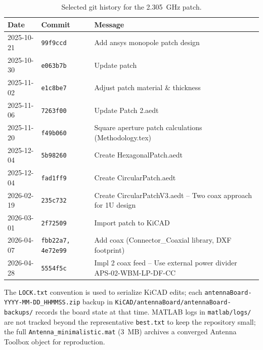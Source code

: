 \begin{table}[H]
\centering
\caption{Selected git history for the 2.305~GHz patch.}
\label{tab:githistory}
\begin{tabular}{l l p{7.5cm}}
\toprule
Date & Commit & Message \\
\midrule
2025-10-21 & \texttt{99f9ccd} & Add ansys monopole patch design \\
2025-10-30 & \texttt{e063b7b} & Update patch \\
2025-11-02 & \texttt{e1c8be7} & Adjust patch material \& thickness \\
2025-11-06 & \texttt{7263f00} & Update Patch 2.aedt \\
2025-11-20 & \texttt{f49b060} & Square aperture patch calculations (Methodology.tex) \\
2025-12-04 & \texttt{5b98260} & Create HexagonalPatch.aedt \\
2025-12-04 & \texttt{fad1ff9} & Create CircularPatch.aedt \\
2026-02-19 & \texttt{235c732} & Create CircularPatchV3.aedt -- Two coax approach for 1U design \\
2026-03-01 & \texttt{2f72509} & Import patch to KiCAD \\
2026-04-07 & \texttt{fbb22a7, 4e72e99} & Add coax (Connector\_Coaxial library, DXF footprint) \\
2026-04-28 & \texttt{5554f5c} & Impl 2 coax feed -- Use external power divider APS-02-WBM-LP-DF-CC \\
\bottomrule
\end{tabular}
\end{table}

The \texttt{LOCK.txt} convention is used to serialize KiCAD edits; each \texttt{antennaBoard-YYYY-MM-DD\_HHMMSS.zip} backup in \texttt{KiCAD/antennaBoard/antennaBoard-backups/} records the board state at that time. MATLAB logs in \texttt{matlab/logs/} are not tracked beyond the representative \texttt{best.txt} to keep the repository small; the full \texttt{Antenna\_minimalistic.mat} (3~MB) archives a converged Antenna Toolbox object for reproduction.
